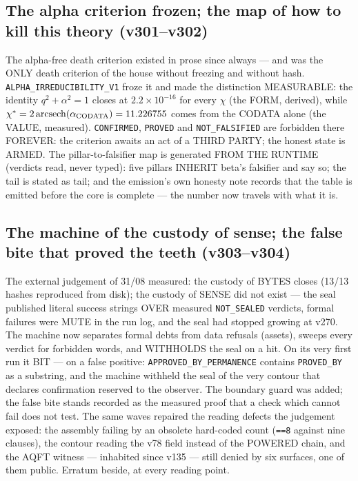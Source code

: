 \documentclass[11pt]{article}
\theoremstyle{definition}\newtheorem{deriv}{Derivation}
\begin{document}
\subsection*{The alpha criterion frozen; the map of how to kill this theory (v301--v302)}The alpha-free death criterion existed in prose since always --- and was the ONLY death criterion of the house without freezing and without hash. \texttt{ALPHA\_IRREDUCIBILITY\_V1} froze it and made the distinction MEASURABLE: the identity $q^2+\alpha^2=1$ closes at $2.2\times10^{-16}$ for every $\chi$ (the FORM, derived), while $\chi^*=2\,\mathrm{arcsech}(\alpha_{\rm CODATA})=11.226755$ comes from the CODATA alone (the VALUE, measured). \texttt{CONFIRMED}, \texttt{PROVED} and \texttt{NOT\_FALSIFIED} are forbidden there FOREVER: the criterion awaits an act of a THIRD PARTY; the honest state is ARMED. The pillar-to-falsifier map is generated FROM THE RUNTIME (verdicts read, never typed): five pillars INHERIT beta's falsifier and say so; the tail is stated as tail; and the emission's own honesty note records that the table is emitted before the core is complete --- the number now travels with what it is.

\subsection*{The machine of the custody of sense; the false bite that proved the teeth (v303--v304)}The external judgement of 31/08 measured: the custody of BYTES closes (13/13 hashes reproduced from disk); the custody of SENSE did not exist --- the seal published literal success strings OVER measured \texttt{NOT\_SEALED} verdicts, formal failures were MUTE in the run log, and the seal had stopped growing at v270. The machine now separates formal debts from data refusals (assets), sweeps every verdict for forbidden words, and WITHHOLDS the seal on a hit. On its very first run it BIT --- on a false positive: \texttt{APPROVED\_BY\_PERMANENCE} contains \texttt{PROVED\_BY} as a substring, and the machine withheld the seal of the very contour that declares confirmation reserved to the observer. The boundary guard was added; the false bite stands recorded as the measured proof that a check which cannot fail does not test. The same waves repaired the reading defects the judgement exposed: the assembly failing by an obsolete hard-coded count (\texttt{==8} against nine clauses), the contour reading the v78 field instead of the POWERED chain, and the AQFT witness --- inhabited since v135 --- still denied by six surfaces, one of them public. Erratum beside, at every reading point.
\end{document}
